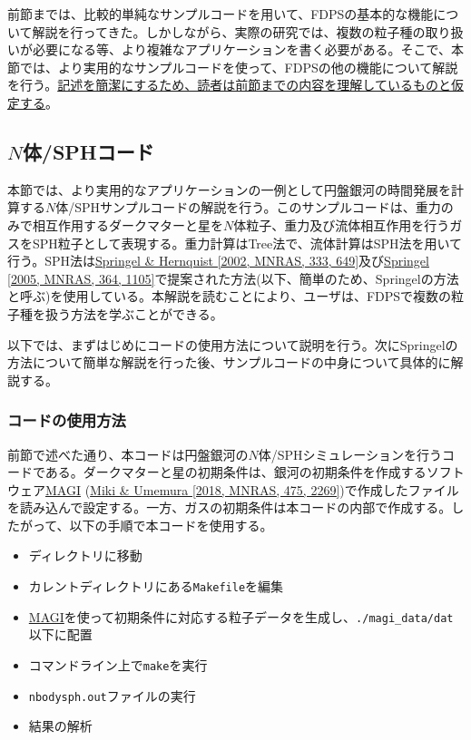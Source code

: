 前節までは、比較的単純なサンプルコードを用いて、FDPSの基本的な機能について解説を行ってきた。しかしながら、実際の研究では、複数の粒子種の取り扱いが必要になる等、より複雑なアプリケーションを書く必要がある。そこで、本節では、より実用的なサンプルコードを使って、FDPSの他の機能について解説を行う。\ul{記述を簡潔にするため、読者は前節までの内容を理解しているものと仮定する}。
\subsection{$N$体/SPHコード} \label{subsec:NbodySPH}
本節では、より実用的なアプリケーションの一例として円盤銀河の時間発展を計算する$N$体/SPHサンプルコードの解説を行う。このサンプルコードは、重力のみで相互作用するダークマターと星を$N$体粒子、重力及び流体相互作用を行うガスをSPH粒子として表現する。重力計算はTree法で、流体計算はSPH法を用いて行う。SPH法は\href{https://doi.org/10.1046/j.1365-8711.2002.05445.x}{Springel \& Hernquist [2002, MNRAS, 333, 649]}及び\href{https://doi.org/10.1111/j.1365-2966.2005.09655.x}{Springel [2005, MNRAS, 364, 1105]}で提案された方法(以下、簡単のため、Springelの方法と呼ぶ)を使用している。本解説を読むことにより、ユーザは、FDPSで複数の粒子種を扱う方法を学ぶことができる。

以下では、まずはじめにコードの使用方法について説明を行う。次にSpringelの方法について簡単な解説を行った後、サンプルコードの中身について具体的に解説する。

\subsubsection{コードの使用方法}
\label{subsubsec:NbodySPH_usage}
前節で述べた通り、本コードは円盤銀河の$N$体/SPHシミュレーションを行うコードである。ダークマターと星の初期条件は、銀河の初期条件を作成するソフトウェア\href{https://bitbucket.org/ymiki/magi}{\textsc{MAGI}} (\href{https://doi.org/10.1093/mnras/stx3327}{Miki \& Umemura [2018, MNRAS, 475, 2269]})で作成したファイルを読み込んで設定する。一方、ガスの初期条件は本コードの内部で作成する。したがって、以下の手順で本コードを使用する。
\begin{itemize}
\item ディレクトリ\dirNameNbodySPHSample に移動
\item カレントディレクトリにある\texttt{Makefile}を編集
\item \href{https://bitbucket.org/ymiki/magi}{\textsc{MAGI}}を使って初期条件に対応する粒子データを生成し、\texttt{./magi\_data/dat}以下に配置
\item コマンドライン上で\texttt{make}を実行
\item \texttt{nbodysph.out}ファイルの実行
\item 結果の解析
\end{itemize}


